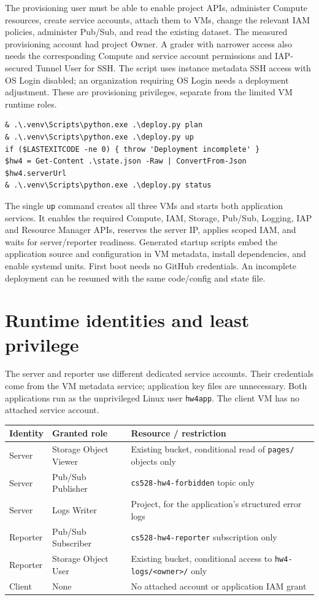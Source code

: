 \documentclass[11pt,letterpaper]{article}
\newcommand{\code}[1]{\texttt{\small #1}}
\newcommand{\newreportpage}[1]{\clearpage\section{#1}}
\begin{document}
The provisioning user must be able to enable project APIs, administer Compute resources,
create service accounts, attach them to VMs, change the relevant IAM policies, administer
Pub/Sub, and read the existing dataset. The measured provisioning account had project
Owner. A grader with narrower access also needs the corresponding Compute and service
account permissions and IAP-secured Tunnel User for SSH. The script uses instance metadata
SSH access with OS Login disabled; an organization requiring OS Login needs a deployment
adjustment. These are provisioning privileges, separate from the limited VM runtime roles.

\begin{lstlisting}
& .\.venv\Scripts\python.exe .\deploy.py plan
& .\.venv\Scripts\python.exe .\deploy.py up
if ($LASTEXITCODE -ne 0) { throw 'Deployment incomplete' }
$hw4 = Get-Content .\state.json -Raw | ConvertFrom-Json
$hw4.serverUrl
& .\.venv\Scripts\python.exe .\deploy.py status
\end{lstlisting}
The single \code{up} command creates all three VMs and starts both application services.
It enables the required Compute, IAM, Storage, Pub/Sub, Logging, IAP and Resource Manager
APIs, reserves the server IP, applies scoped IAM, and waits for server/reporter readiness.
Generated startup scripts embed the application source and configuration in VM metadata,
install dependencies, and enable systemd units. First boot needs no GitHub credentials.
An incomplete deployment can be resumed with the same code/config and state file.

\newreportpage{Runtime identities and least privilege}
\label{sec:iam}
The server and reporter use different dedicated service accounts. Their credentials come
from the VM metadata service; application key files are unnecessary. Both applications run
as the unprivileged Linux user \code{hw4app}. The client VM has no attached service account.

\begin{tabularx}{\linewidth}{@{}p{0.95in}p{1.9in}Y@{}}\toprule
Identity & Granted role & Resource / restriction \\ \midrule
Server & Storage Object Viewer & Existing bucket, conditional read of \code{pages/} objects only \\
Server & Pub/Sub Publisher & \code{cs528-hw4-forbidden} topic only \\
Server & Logs Writer & Project, for the application's structured error logs \\
Reporter & Pub/Sub Subscriber & \code{cs528-hw4-reporter} subscription only \\
Reporter & Storage Object User & Existing bucket, conditional access to \code{hw4-logs/<owner>/} only \\
Client & None & No attached account or application IAM grant \\
\bottomrule\end{tabularx}
\end{document}
